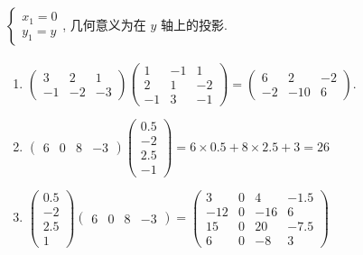 	 \paragraph{} %
		 $\begin{cases}
				 x_1 = 0 \\
				 y_1 = y
			 \end{cases}$,
		 几何意义为在 $y$ 轴上的投影.


	 \paragraph{} %
		 \begin{enumerate}
			 \item %
			       $\begin{pmatrix}
					       3  & 2  & 1  \\
					       -1 & -2 & -3
				       \end{pmatrix}
				       \begin{pmatrix}
					       1  & -1 & 1  \\
					       2  & 1  & -2 \\
					       -1 & 3  & -1
				       \end{pmatrix} =
				       \begin{pmatrix}
					       6  & 2   & -2 \\
					       -2 & -10 & 6
				       \end{pmatrix}$.

			 \item %
			       $\begin{pmatrix}
					       6 & 0 & 8 & -3
				       \end{pmatrix}
				       \begin{pmatrix}
					       0.5 \\
					       -2  \\
					       2.5 \\
					       -1
				       \end{pmatrix} =
				       6 \times 0.5 + 8 \times 2.5 + 3 = 26$

			 \item %
			       $\begin{pmatrix}
					       0.5 \\
					       -2  \\
					       2.5 \\
					       1
				       \end{pmatrix}
				       \begin{pmatrix}
					       6 & 0 & 8 & -3
				       \end{pmatrix} =
				       \begin{pmatrix}
					       3   & 0 & 4   & -1.5 \\
					       -12 & 0 & -16 & 6    \\
					       15  & 0 & 20  & -7.5 \\
					       6   & 0 & -8  & 3
				       \end{pmatrix}$


\end{enumerate}
